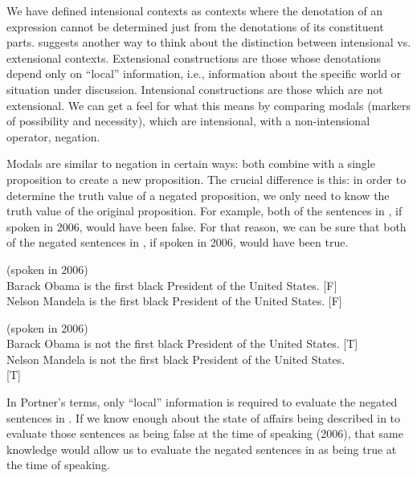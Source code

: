 We have defined intensional contexts as contexts where the denotation of an expression cannot be determined just from the denotations of its constituent parts. \citet[132]{Portner2005} suggests another way to think about the distinction between intensional vs. extensional contexts. Extensional constructions are those whose denotations depend only on “local” information, i.e., information about the specific world or situation under discussion. Intensional constructions are those which are not extensional. We can get a feel for what this means by comparing modals (markers of possibility and necessity), which are intensional, with a non-intensional operator, negation.


Modals are similar to negation in certain ways: both combine with a single proposition to create a new proposition. The crucial difference is this: in order to determine the truth value of a negated proposition, we only need to know the truth value of the original proposition. For example, both of the sentences in , if spoken in 2006, would have been false. For that reason, we can be sure that both of the negated sentences in , if spoken in 2006, would have been true.


\ea \label{ex:15.21}
(spoken in 2006)\\
\ea  Barack Obama is the first black President of the United States. \hfill  [F]\\
\ex Nelson Mandela is the first black President of the United States.  \hfill [F]
                       \z
\z

\pagebreak  %
\ea \label{ex:15.22}
(spoken in 2006) \\
\ea  Barack Obama is not the first black President of the United States. \hfill [T]\\
\ex Nelson Mandela is not the first black President of the United States. \\  \hfill [T]
                       \z
\z

In Portner's terms, only “local” information is required to evaluate the negated sentences in . If we know enough about the state of affairs being described in  to evaluate those sentences as being false at the time of speaking (2006), that same knowledge would allow us to evaluate the negated sentences in  as being true at the time of speaking.


